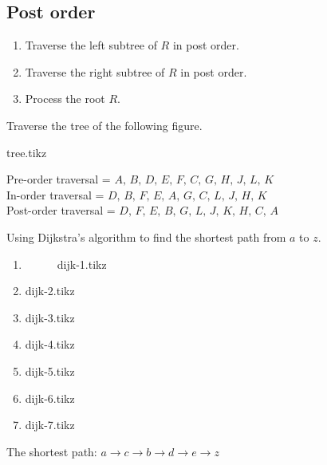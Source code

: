 \documentclass[../main-sheet.tex]{subfiles}
\begin{document}
\subsection{Post order}
\begin{enumerate}
    \item Traverse the left subtree of $ R $ in post order.
    \item Traverse the right subtree of $ R $ in post order.
    \item Process the root $ R $.
\end{enumerate}
\begin{ex}
    Traverse the tree of the following figure.\\
    \begin{center}
        {tree.tikz}\\
    \end{center}
    Pre-order traversal = $ A,\,B,\,D,\,E,\,F,\,C,\,G,\,H,\,J,\,L,\,K $\\
    In-order traversal = $ D,\,B,\,F,\,E,\,A,\,G,\,C,\,L,\,J,\,H,\,K $\\
    Post-order traversal = $ D,\,F,\,E,\,B,\,G,\,L,\,J,\,K,\,H,\,C,\,A $ 
\end{ex}
\newpage
\begin{ex}
    Using Dijkstra's algorithm to find the shortest path from $ a $ to $ z $.\\
    \begin{enumerate}[label=Step \arabic*:]
        \item \hfill
        \begin{figure}[H]
            \centering
            {dijk-1.tikz}
        \end{figure}
        \item \hfill\begin{center}
            {dijk-2.tikz}
        \end{center}
        \item \hfill\begin{center}
            {dijk-3.tikz}
        \end{center}
        \item \hfill\begin{center}
            {dijk-4.tikz}
        \end{center}
        \item \hfill\begin{center}
            {dijk-5.tikz}
        \end{center}
        \item \hfill\begin{center}
            {dijk-6.tikz}
        \end{center}
        \item \hfill\begin{center}
            {dijk-7.tikz}
        \end{center}
    \end{enumerate}
    The shortest path: $ a\to c\to b\to d\to e\to z $
\end{ex}
\end{document}
